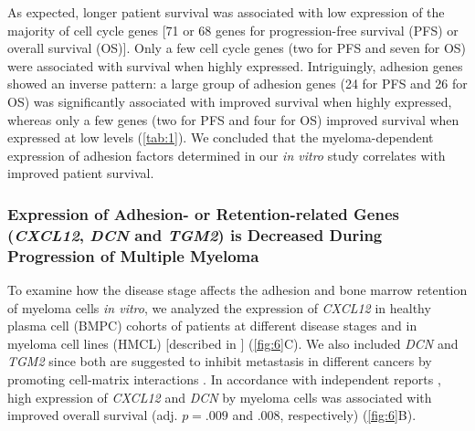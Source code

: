 As expected, longer patient survival was associated with low expression of the
majority of cell cycle genes [71 or 68 genes for progression-free survival (PFS)
        or overall survival (OS)]. Only a few cell cycle genes (two for PFS and seven
for OS) were associated with survival when highly expressed. Intriguingly,
adhesion genes showed an inverse pattern: a large group of adhesion genes (24
for PFS and 26 for OS) was significantly associated with improved survival when
highly expressed, whereas only a few genes (two for PFS and four for OS)
improved survival when expressed at low levels (\autoref{tab:1}). We concluded
that the myeloma-dependent expression of adhesion factors determined in our
\textit{in vitro} study correlates with improved patient survival.


\subsubsection*{Expression of Adhesion- or Retention-related Genes (\textit{CXCL12}, \textit{DCN} and \textit{TGM2}) is Decreased During Progression of Multiple Myeloma}
To examine how the disease stage affects the adhesion and bone marrow retention
of myeloma cells \textit{in vitro}, we analyzed the expression of
\textit{CXCL12} in healthy plasma cell (BMPC) cohorts of patients at different
disease stages and in myeloma cell lines (HMCL)
[described in \citet{seckingerCD38ImmunotherapeuticTarget2018}] (\autoref{fig:6}C). We also
included \textit{DCN} and \textit{TGM2} since both are suggested to inhibit
metastasis in different cancers by promoting cell-matrix interactions
\cite{huDecorinmediatedSuppressionTumorigenesis2021,tabolacciRoleTissueTransglutaminase2019}.
In accordance with independent reports
\cite{huangHigherDecorinLevels2015,baoCXCR4GoodSurvival2013}, high
expression of \textit{CXCL12} and \textit{DCN} by myeloma cells was associated
with improved overall survival (adj. \( p = .009 \) and \( .008 \),
respectively) (\autoref{fig:6}B).





